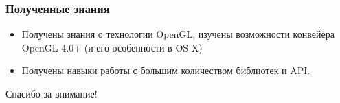 \documentclass{beamer}
\begin{document}
    \begin{frame}\frametitle{Полученные знания}
        \begin{itemize}%
            \item	Получены знания о технологии OpenGL, изучены возможности конвейера OpenGL 4.0+ (и его особенности в OS X)
            \item	Получены навыки работы с большим количеством библиотек и API.
        \end{itemize}
    \end{frame}

    \begin{frame}
        \begin{center}
            Спасибо за внимание!
        \end{center}
    \end{frame}
\end{document}
